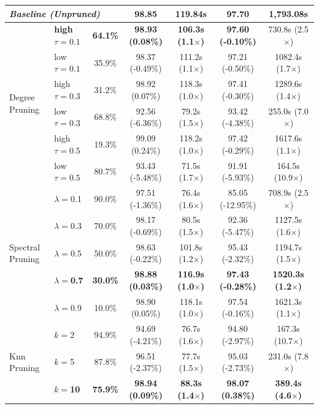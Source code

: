\documentclass[pdflatex,sn-mathphys-num]{sn-jnl}%
\theoremstyle{thmstyleone}%
\theoremstyle{thmstyletwo}%
\theoremstyle{thmstylethree}%
\theoremstyle{plain} %
\theoremstyle{definition} %
\theoremstyle{remark} %
\theoremstyle{plain} %
\begin{document}
\begin{table}[ht]
\begin{tabular}{llccccc}
\multicolumn{3}{l}{\textit{Baseline (Unpruned)}} & 98.85 & 119.84s & 97.70 & 1,793.08s \\
\midrule
\multirow{6}{*}{Degree Pruning} 
 & \textbf{high $\tau =0.1$} & \textbf{64.1\%} & \textbf{98.93 (0.08\%)} & \textbf{106.3s (1.1$\times$)} & \textbf{97.60 (-0.10\%)} & 730.8s (2.5$\times$) \\
 & low $\tau =0.1$& 35.9\% & 98.37 (-0.49\%) & 111.2s (1.1$\times$) & 97.21 (-0.50\%) & 1082.4s (1.7$\times$) \\
 & high$\tau =0.3$ & 31.2\% & 98.92 (0.07\%) & 118.3s (1.0$\times$) & 97.41 (-0.30\%) & 1289.6s (1.4$\times$) \\
 & low $\tau =0.3$& 68.8\% & 92.56 (-6.36\%) & 79.2s (1.5$\times$) & 93.42 (-4.38\%) & 255.0s (7.0$\times$) \\
 & high $\tau =0.5$& 19.3\% & 99.09 (0.24\%) & 118.2s (1.0$\times$) & 97.42 (-0.29\%) & 1617.6s (1.1$\times$) \\
 & low $\tau =0.5$& 80.7\% & 93.43 (-5.48\%) & 71.5s (1.7$\times$) & 91.91 (-5.93\%) & 164.5s (10.9$\times$) \\
\midrule
\multirow{5}{*}{Spectral Pruning} 
 & $\lambda=$0.1 & 90.0\% & 97.51 (-1.36\%) & 76.4s (1.6$\times$) & 85.05 (-12.95\%) & 708.9s (2.5$\times$) \\
 & $\lambda=$0.3 & 70.0\% & 98.17 (-0.69\%) & 80.5s (1.5$\times$) & 92.36 (-5.47\%) & 1127.5s (1.6$\times$) \\
 & $\lambda=$0.5 & 50.0\% & 98.63 (-0.22\%) & 101.8s (1.2$\times$) & 95.43 (-2.32\%) & 1194.7s (1.5$\times$) \\
 & \textbf{$\lambda=$0.7} & \textbf{30.0\%} & \textbf{98.88 (0.03\%)} & \textbf{116.9s (1.0$\times$)} & \textbf{97.43 (-0.28\%)} & \textbf{1520.3s (1.2$\times$)} \\
 & $\lambda=$0.9 & 10.0\% & 98.90 (0.05\%) & 118.1s (1.0$\times$) & 97.54 (-0.16\%) & 1621.3s (1.1$\times$) \\
\midrule
\multirow{3}{*}{Knn Pruning} 
 & $k=$2 & 94.9\% & 94.69 (-4.21\%) & 76.7s (1.6$\times$) & 94.80 (-2.97\%) & 167.3s (10.7$\times$) \\
 & $k=$5 & 87.8\% & 96.51 (-2.37\%) & 77.7s (1.5$\times$) & 95.03 (-2.73\%) & 231.0s (7.8$\times$) \\
 & \textbf{$k=$10} & \textbf{75.9\%} & \textbf{98.94 (0.09\%)} & \textbf{88.3s (1.4$\times$)} & \textbf{98.07 (0.38\%)} & \textbf{389.4s (4.6$\times$)} \\
\bottomrule
\end{tabular}
\end{table}
\end{document}
